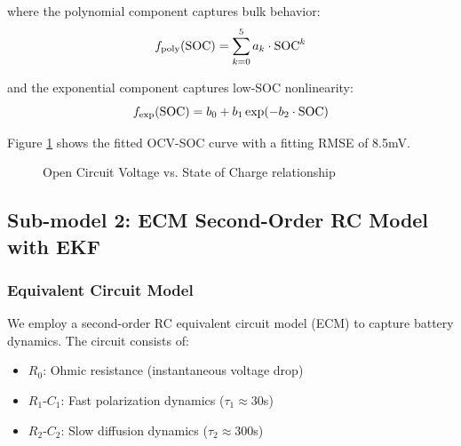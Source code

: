 where the polynomial component captures bulk behavior:
\begin{equation}
f_{\text{poly}}(\text{SOC}) = \sum_{k=0}^{5} a_k \cdot \text{SOC}^k
\end{equation}

and the exponential component captures low-SOC nonlinearity:
\begin{equation}
f_{\text{exp}}(\text{SOC}) = b_0 + b_1 \exp(-b_2 \cdot \text{SOC})
\end{equation}

Figure \ref{fig:ocv_soc} shows the fitted OCV-SOC curve with a fitting RMSE of 8.5mV.

\begin{figure}[H]
\centering
{}
\caption{Open Circuit Voltage vs. State of Charge relationship}
\label{fig:ocv_soc}
\end{figure}

\subsection{Sub-model 2: ECM Second-Order RC Model with EKF}

\subsubsection{Equivalent Circuit Model}

We employ a second-order RC equivalent circuit model (ECM) to capture battery dynamics. The circuit consists of:
\begin{itemize}
    \item $R_0$: Ohmic resistance (instantaneous voltage drop)
    \item $R_1$-$C_1$: Fast polarization dynamics ($\tau_1 \approx 30$s)
    \item $R_2$-$C_2$: Slow diffusion dynamics ($\tau_2 \approx 300$s)
\end{itemize}

